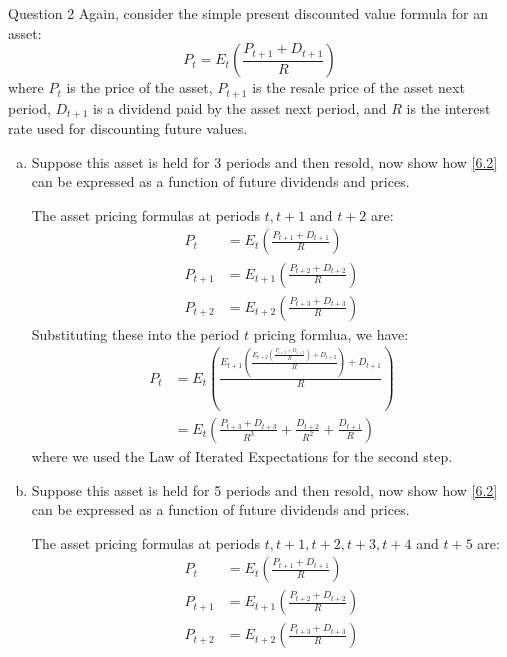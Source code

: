 \documentclass[a4paper]{article}
\begin{document}
	\begin{questionbox}{Question 2}
		Again, consider the simple present discounted value formula for an asset:
		\begin{equation}
			P_t = E_t \left( \frac{P_{t+1} + D_{t+1}}{R} \right) \label{6.2}
		\end{equation}
		where \( P_t \) is the price of the asset, \( P_{t+1} \) is the resale price of the asset next period, \( D_{t+1} \) is a dividend paid by the asset next period, and \( R \) is the interest rate used for discounting future values.
		\begin{enumerate}[(a)]
			\item Suppose this asset is held for 3 periods and then resold, now show how \cref*{6.2} can be expressed as a function of future dividends and prices.
			\begin{explanationbox}
				The asset pricing formulas at periods \( t,t+1 \) and \( t+2 \) are:
				\begin{align*}
					P_t &= E_t \left( \frac{P_{t+1} + D_{t+1}}{R} \right)\\
					P_{t+1} &= E_{t+1} \left( \frac{P_{t+2} + D_{t+2}}{R} \right)\\
					P_{t+2} &= E_{t+2} \left( \frac{P_{t+3} + D_{t+3}}{R} \right)
				\end{align*}
				Substituting these into the period \( t \) pricing formlua, we have:
				\begin{align*}
					P_t &= E_t \left( \frac{E_{t+1} \left( \frac{E_{t+2} \left( \frac{P_{t+3} + D_{t+3}}{R} \right) + D_{t+2}}{R} \right) + D_{t+1}}{R} \right)\\
					&= E_t \left( \frac{P_{t+3} + D_{t+3}}{R^3} + \frac{D_{t+2}}{R^2} + \frac{D_{t+1}}{R} \right)
				\end{align*}
				where we used the Law of Iterated Expectations for the second step.
			\end{explanationbox}
			\item Suppose this asset is held for 5 periods and then resold, now show how \cref{6.2} can be expressed as a function of future dividends and prices.
			\begin{explanationbox}
				The asset pricing formulas at periods \( t,t+1,t+2,t+3,t+4 \) and \( t+5 \) are:
				\begin{align*}
					P_t &= E_t \left( \frac{P_{t+1} + D_{t+1}}{R} \right)\\
					P_{t+1} &= E_{t+1} \left( \frac{P_{t+2} + D_{t+2}}{R} \right)\\
					P_{t+2} &= E_{t+2} \left( \frac{P_{t+3} + D_{t+3}}{R} \right)\\

\end{align*}
\end{explanationbox}
\end{enumerate}
\end{questionbox}
\end{document}
